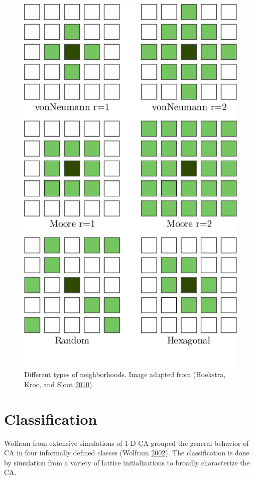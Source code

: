\documentclass[
  openany]{book}
\begin{document}
\begin{figure}

{\centering \includegraphics[width=0.8\linewidth]{pics/neighborhoods} 

}

\caption{Different types of neighborhoods. Image adapted from (Hoekstra, Kroc, and Sloot \protect\hyperlink{ref-hoekstra2010simulating}{2010}).}\label{fig:CA-neighborhoods}
\end{figure}

\hypertarget{classification}{%
\section{Classification}\label{classification}}

Wolfram from extensive simulations of 1-D CA grouped the general behavior of CA in four informally defined classes (Wolfram \protect\hyperlink{ref-wolfram2002new}{2002}). The classification is done by simulation from a variety of lattice initializations to broadly characterize the CA.
\end{document}
